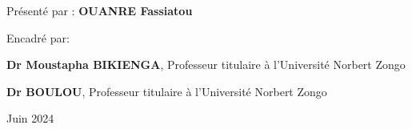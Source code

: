 \begin{titlepage}
\begin{center}
\vspace{30pt}

{\fontsize{16}{1}\selectfont Présenté par : \textbf{OUANRE Fassiatou}}

\end{center}

\vspace{30pt}
{\fontsize{16}{1}\selectfont Encadré par:}\\
\vspace{2pt}

{\fontsize{14}{1}\selectfont \textbf{Dr Moustapha BIKIENGA}}, Professeur titulaire à l'Université Norbert Zongo\\
\vspace{2pt}

{\fontsize{14}{1}\selectfont \textbf{Dr BOULOU}}, Professeur titulaire à l'Université Norbert Zongo\\
\vspace{20pt}

\begin{center}
Juin 2024
\end{center}
\end{titlepage}
